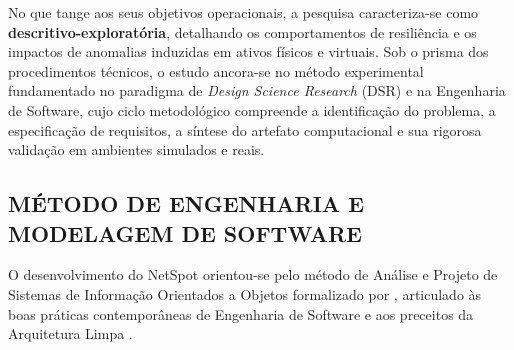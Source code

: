 \documentclass[12pt,a4paper]{article}
\begin{document}
No que tange aos seus objetivos operacionais, a pesquisa caracteriza-se como \textbf{descritivo-exploratória}, detalhando os comportamentos de resiliência e os impactos de anomalias induzidas em ativos físicos e virtuais. Sob o prisma dos procedimentos técnicos, o estudo ancora-se no método experimental fundamentado no paradigma de \textit{Design Science Research} (DSR) e na Engenharia de Software, cujo ciclo metodológico compreende a identificação do problema, a especificação de requisitos, a síntese do artefato computacional e sua rigorosa validação em ambientes simulados e reais.

\subsection{MÉTODO DE ENGENHARIA E MODELAGEM DE SOFTWARE}
O desenvolvimento do NetSpot orientou-se pelo método de Análise e Projeto de Sistemas de Informação Orientados a Objetos formalizado por , articulado às boas práticas contemporâneas de Engenharia de Software \cite{engsoftmoderna} e aos preceitos da Arquitetura Limpa \cite{martin2019arquitetura}.
\end{document}
